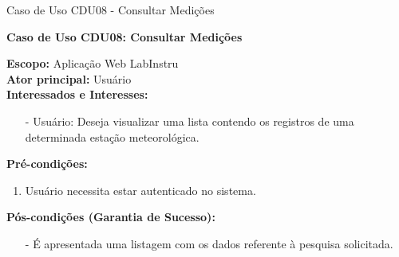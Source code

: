 \begin{quadro}[H]
	\centering
	\caption{Caso de Uso CDU08 - Consultar Medições}

	\begin{framed}

		\textbf{Caso de Uso CDU08: Consultar Medições}\\

		\begin{flushleft}

		\textbf{Escopo:} Aplicação Web LabInstru\\

		\textbf{Ator principal:} Usuário\\

		\textbf{Interessados e Interesses:}
		\begin{itemize}
			\item[-] Usuário: Deseja visualizar uma lista contendo os registros de uma determinada estação meteorológica.
		\end{itemize}

		\textbf{Pré-condições:}\\
			 \begin{enumerate}
			 	\item{Usuário necessita estar autenticado no sistema.}
			 \end{enumerate}

		\textbf{Pós-condições (Garantia de Sucesso):}
		\begin{itemize}
			\item[-] É apresentada uma listagem com os dados referente à pesquisa  solicitada.
		\end{itemize}


\end{flushleft}
\end{framed}
\end{quadro}

